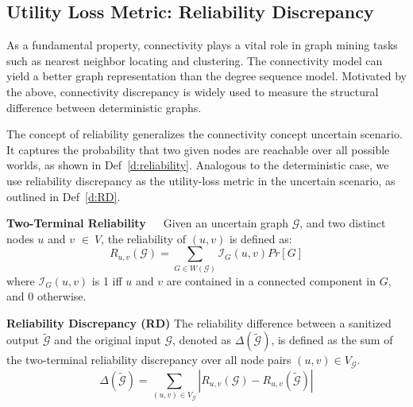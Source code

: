 \subsection{Utility Loss Metric: Reliability Discrepancy}

As a fundamental property, connectivity plays a vital role in graph mining tasks such as nearest neighbor locating and clustering. 
The connectivity model can yield a better graph representation than the degree sequence model. 
Motivated by the above, connectivity discrepancy is widely used to measure the structural difference between deterministic graphs. 

The concept of reliability generalizes the connectivity concept uncertain scenario. 
It captures the probability that two given nodes are reachable over all possible worlds, as shown in Def~\ref{d:reliability}. 
Analogous to the deterministic case, we use reliability discrepancy as the utility-loss metric in the uncertain scenario, as outlined in Def~\ref{d:RD}. 
\begin{definition}
    \textbf{Two-Terminal Reliability~\cite{Colbourn_Colbourn_1987}}~~Given an uncertain graph $\mathcal{G}$, and two distinct nodes $u$ and $v$  $\in~V$, the reliability of $(u,v)$ is defined as:
        \begin{equation*}
                R_{u,v}(\mathcal{G})= \sum_{G \in W(\mathcal{G})}  \mathcal{I}_{G}(u,v) Pr[G] 
        \end{equation*}
    where $\mathcal{I}_{G}(u,v)$ is 1 iff $u$ and $v$ are contained in a connected component in $G$, and 0 otherwise.   
    \label{d:reliability}
\end{definition}

\theoremstyle{definition}
\begin{definition}
    \textbf{Reliability Discrepancy (RD)}
    The reliability difference between a sanitized output $\tilde{\mathcal{G}}$ and the original input $\mathcal{G}$, 
    denoted as $\Delta(\tilde{\mathcal{G}})$, 
    is defined as the sum of the two-terminal reliability discrepancy over all node pairs $(u,v) \in V_\mathcal{G}$.
    \begin{equation*}
        \Delta(\tilde{\mathcal{G}})=\sum_{(u,v) \in V_\mathcal{G} }|R_{u,v}(\mathcal{G})-R_{u,v}(\tilde{\mathcal{G}})|
    \end{equation*}
    \label{d:RD}
\end{definition}


